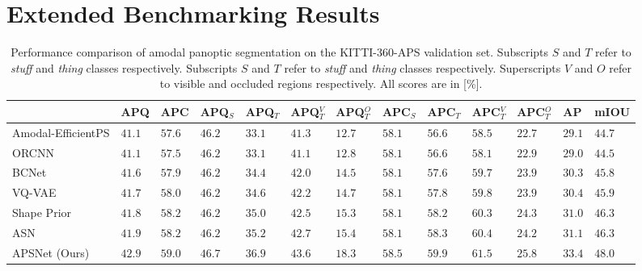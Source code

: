 \documentclass[10pt,twocolumn,letterpaper]{article}
\begin{document}
\section{Extended Benchmarking Results}
\label{sec:supp_benchmark}
\begin{table*}
\footnotesize 
\centering
\begin{tabular}{p{2.8cm}|p{0.4cm}p{0.4cm}p{0.5cm}p{0.5cm}p{0.5cm}p{0.5cm}p{0.5cm}p{0.5cm}p{0.5cm}p{0.5cm}p{0.3cm}p{0.6cm}}
\toprule
&  APQ  & APC & APQ$_S$ &APQ$_T$ & APQ$^V_T$ & APQ$^O_T$ & APC$_S$&  APC$_T$ & APC$^V_T$ & APC$^O_T$ & AP & mIOU\\
\midrule
Amodal-EfficientPS & $41.1$ & $57.6$ & $46.2$ & $33.1$ & $41.3$ & $12.7$ & $58.1$ & $56.6$ & $58.5$ & $22.7$ & $29.1$ & $44.7$ \\
ORCNN~\cite{follmann2019learning}  & $41.1$ & $57.5$ & $46.2$ & $33.1$ & $41.1$ & $12.8$ & $58.1$ & $56.6$ & $58.1$ & $22.9$ & $29.0$ & $44.5$  \\
BCNet~\cite{Ke_2021_CVPR}  & $41.6$ & $57.9$ & $46.2$ & $34.4$ & $42.0$ & $14.5$ & $58.1$ & $57.6$ & $59.7$ & $23.9$ & $30.3$  & $45.8$  \\
VQ-VAE~\cite{jang2020learning}  & $41.7$ & $58.0$  & $46.2$ & $34.6$ & $42.2$ & $14.7$ & $58.1$ & $57.8$ & $59.8$ & $23.9$ & $30.4$ & $45.9$   \\
Shape Prior~\cite{yuting2021amodal}  & $41.8$ & $58.2$  & $46.2$ & $35.0$ & $42.5$ & $15.3$ & $58.1$ & $58.2$ & $60.3$ & $24.3$ & $31.0$ & $46.3$ \\
ASN~\cite{qi2019amodal} & $41.9$ & $58.2$ & $46.2$ & $35.2$ & $42.7$ & $15.4$ & $58.1$ & $58.3$ & $60.4$ & $24.2$ & $31.1$ & $46.3$    \\
\midrule
\mbox{APSNet} (Ours)  &  $\mathbf{42.9}$ & $\mathbf{59.0}$  & $\mathbf{46.7}$ & $\mathbf{36.9}$ &$\mathbf{43.6}$ & $\mathbf{18.3}$  & $\mathbf{58.5}$ & $\mathbf{59.9}$  &$\mathbf{61.5}$ & $\mathbf{25.8}$& $\mathbf{33.4}$ &$\mathbf{48.0}$ \\
\bottomrule
\end{tabular}
\caption{Performance comparison of amodal panoptic segmentation on the KITTI-360-APS validation set. Subscripts $S$ and $T$ refer to \textit{stuff} and \textit{thing} classes respectively. Subscripts $S$ and $T$ refer to \textit{stuff} and \textit{thing} classes respectively. Superscripts $V$ and $O$ refer to visible and occluded regions respectively. All scores are in [\%].}
\label{tab:kittiEvaluations}
\end{table*}
\end{document}
